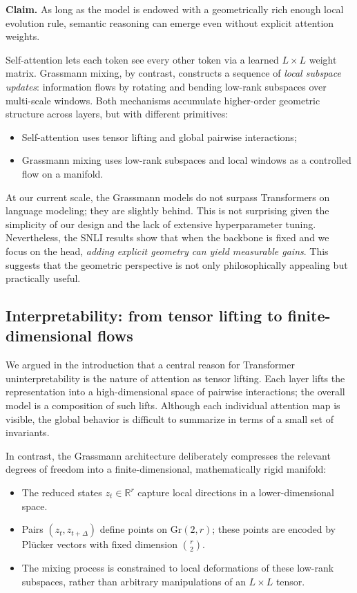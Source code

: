 \documentclass[11pt]{article}
\newcommand{\Gr}{\mathrm{Gr}}
\begin{document}
\medskip
\noindent\textbf{Claim.} As long as the model is endowed with a geometrically rich enough local evolution rule, semantic reasoning can emerge even without explicit attention weights.
\medskip

Self-attention lets each token see every other token via a learned $L\times L$ weight matrix. Grassmann mixing, by contrast, constructs a sequence of \emph{local subspace updates}: information flows by rotating and bending low-rank subspaces over multi-scale windows. Both mechanisms accumulate higher-order geometric structure across layers, but with different primitives:

\begin{itemize}
    \item Self-attention uses tensor lifting and global pairwise interactions;
    \item Grassmann mixing uses low-rank subspaces and local windows as a controlled flow on a manifold.
\end{itemize}

At our current scale, the Grassmann models do not surpass Transformers on language modeling; they are slightly behind. This is not surprising given the simplicity of our design and the lack of extensive hyperparameter tuning. Nevertheless, the SNLI results show that when the backbone is fixed and we focus on the head, \emph{adding explicit geometry can yield measurable gains}. This suggests that the geometric perspective is not only philosophically appealing but practically useful.

\subsection{Interpretability: from tensor lifting to finite-dimensional flows}

We argued in the introduction that a central reason for Transformer uninterpretability is the nature of attention as tensor lifting. Each layer lifts the representation into a high-dimensional space of pairwise interactions; the overall model is a composition of such lifts. Although each individual attention map is visible, the global behavior is difficult to summarize in terms of a small set of invariants.

In contrast, the Grassmann architecture deliberately compresses the relevant degrees of freedom into a finite-dimensional, mathematically rigid manifold:

\begin{itemize}
    \item The reduced states $z_t \in \mathbb{R}^r$ capture local directions in a lower-dimensional space.
    \item Pairs $(z_t, z_{t+\Delta})$ define points on $\Gr(2,r)$; these points are encoded by Pl\"ucker vectors with fixed dimension $\binom{r}{2}$.
    \item The mixing process is constrained to local deformations of these low-rank subspaces, rather than arbitrary manipulations of an $L\times L$ tensor.
\end{itemize}
\end{document}
